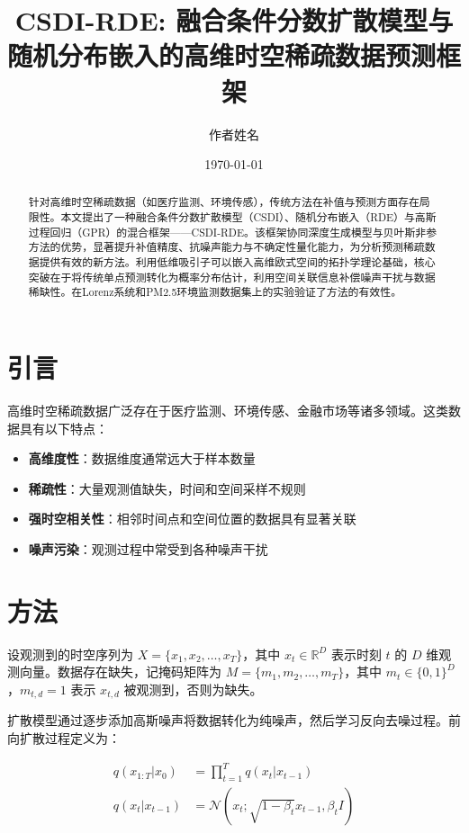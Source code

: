 \documentclass[12pt, a4paper]{article}
\title{CSDI-RDE: 融合条件分数扩散模型与随机分布嵌入的高维时空稀疏数据预测框架}
\author{作者姓名}
\date{\today}
\begin{document}
\maketitle

\begin{abstract}
针对高维时空稀疏数据（如医疗监测、环境传感），传统方法在补值与预测方面存在局限性。本文提出了一种融合条件分数扩散模型（CSDI）、随机分布嵌入（RDE）与高斯过程回归（GPR）的混合框架——CSDI-RDE。该框架协同深度生成模型与贝叶斯非参方法的优势，显著提升补值精度、抗噪声能力与不确定性量化能力，为分析预测稀疏数据提供有效的新方法。利用低维吸引子可以嵌入高维欧式空间的拓扑学理论基础，核心突破在于将传统单点预测转化为概率分布估计，利用空间关联信息补偿噪声干扰与数据稀缺性。在Lorenz系统和PM2.5环境监测数据集上的实验验证了方法的有效性。
\end{abstract}

\section{引言}

高维时空稀疏数据广泛存在于医疗监测、环境传感、金融市场等诸多领域。这类数据具有以下特点：
\begin{itemize}
    \item \textbf{高维度性}：数据维度通常远大于样本数量
    \item \textbf{稀疏性}：大量观测值缺失，时间和空间采样不规则
    \item \textbf{强时空相关性}：相邻时间点和空间位置的数据具有显著关联
    \item \textbf{噪声污染}：观测过程中常受到各种噪声干扰
\end{itemize}

\section{方法}

设观测到的时空序列为 $X = \{x_1, x_2, \dots, x_T\}$，其中 $x_t \in \mathbb{R}^D$ 表示时刻 $t$ 的 $D$ 维观测向量。数据存在缺失，记掩码矩阵为 $M = \{m_1, m_2, \dots, m_T\}$，其中 $m_t \in \{0, 1\}^D$，$m_{t,d}=1$ 表示 $x_{t,d}$ 被观测到，否则为缺失。

扩散模型通过逐步添加高斯噪声将数据转化为纯噪声，然后学习反向去噪过程。前向扩散过程定义为：

\begin{align}
q(x_{1:T} | x_0) &= \prod_{t=1}^T q(x_t | x_{t-1}) \\
q(x_t | x_{t-1}) &= \mathcal{N}(x_t; \sqrt{1-\beta_t} x_{t-1}, \beta_t I)
\end{align}
\end{document}
